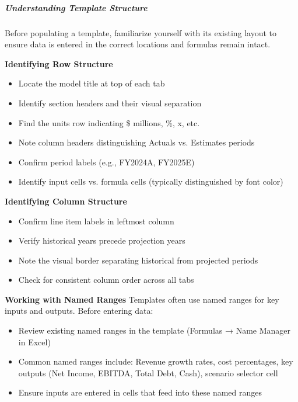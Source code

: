 \documentclass[11pt]{article}
\begin{document}
\subparagraph{Understanding Template Structure}\mbox{}\par

Before populating a template, familiarize yourself with its existing layout to ensure data is entered in the correct locations and formulas remain intact.


\textbf{Identifying Row Structure}

\begin{itemize}[leftmargin=*,itemsep=2pt,topsep=2pt]
\item {} Locate the model title at top of each tab
\item {} Identify section headers and their visual separation
\item {} Find the units row indicating \$ millions, \%, x, etc.
\item {} Note column headers distinguishing Actuals vs. Estimates periods
\item {} Confirm period labels (e.g., FY2024A, FY2025E)
\item {} Identify input cells vs. formula cells (typically distinguished by font color)
\end{itemize}

\textbf{Identifying Column Structure}

\begin{itemize}[leftmargin=*,itemsep=2pt,topsep=2pt]
\item {} Confirm line item labels in leftmost column
\item {} Verify historical years precede projection years
\item {} Note the visual border separating historical from projected periods
\item {} Check for consistent column order across all tabs
\end{itemize}

\textbf{Working with Named Ranges} Templates often use named ranges for key inputs and outputs. Before entering data:

\begin{itemize}[leftmargin=*,itemsep=2pt,topsep=2pt]
\item {} Review existing named ranges in the template (Formulas → Name Manager in Excel)
\item {} Common named ranges include: Revenue growth rates, cost percentages, key outputs (Net Income, EBITDA, Total Debt, Cash), scenario selector cell
\item {} Ensure inputs are entered in cells that feed into these named ranges
\end{itemize}
\end{document}
